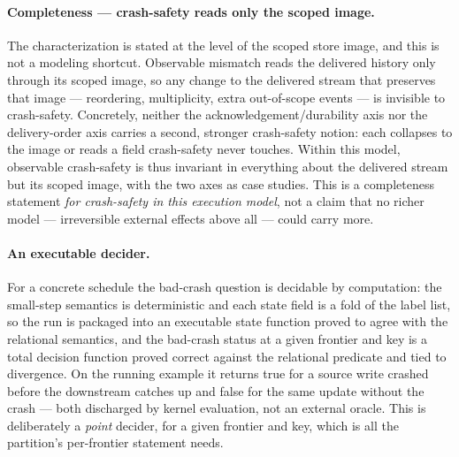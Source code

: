 \documentclass[11pt,a4paper]{article}
\begin{document}
\paragraph{Completeness --- crash-safety reads only the scoped image.} The
characterization is stated at the level of the scoped store image, and this is
not a modeling shortcut. Observable mismatch reads the delivered history only
through its scoped image, so any change to the delivered stream that preserves
that image --- reordering, multiplicity, extra out-of-scope events --- is
invisible to crash-safety. Concretely, neither the acknowledgement/durability
axis nor the delivery-order axis carries a second, stronger crash-safety notion:
each collapses to the image or reads a field crash-safety never touches. Within
this model, observable crash-safety is thus invariant in everything about the
delivered stream but its scoped image, with the two axes as case studies. This
is a
completeness statement \emph{for crash-safety in this execution model}, not a
claim that no richer model --- irreversible external effects above all --- could
carry more.

\paragraph{An executable decider.} For a concrete schedule the bad-crash
question is decidable by computation: the small-step semantics is deterministic
and each state field is a fold of the label list, so the run is packaged into an
executable state function proved to agree with the relational semantics, and the
bad-crash status at a given frontier and key is a total decision function proved
correct against the relational predicate and tied to divergence. On the running
example it returns true for a source write crashed before the downstream catches
up and false for the same update without the crash --- both discharged by kernel
evaluation, not an external oracle. This is deliberately a \emph{point} decider,
for a given frontier and key, which is all the partition's per-frontier statement
needs.
\end{document}
